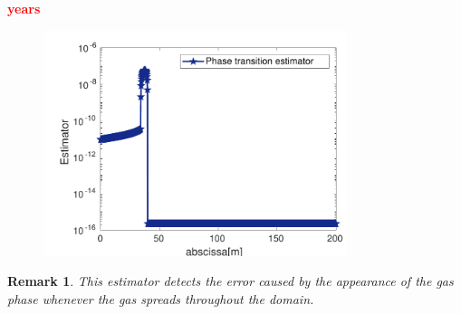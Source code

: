 \documentclass[10 pt]{beamer}
\newtheorem{remark}[theorem]{Remark}
\begin{document}
\begin{frame}
 \begin{minipage}{.49 \textwidth}
 \hspace{2 cm}\scriptsize{ \textbf{\textcolor{red}{  years}}}
\vspace{-0.3 cm}
\begin{figure}
\includegraphics[width=0.79\textwidth]{image/MODIF_phase_transition_estimator_appearance_gas_nt=9_cv}
\end{figure}
 \end{minipage}
\begin{minipage}{.49 \textwidth}
\begin{remark}
This estimator detects the error caused by the 
 appearance of the gas phase whenever the gas spreads throughout the domain. 
\end{remark}
\end{minipage}
\end{frame}
%
\end{document}
